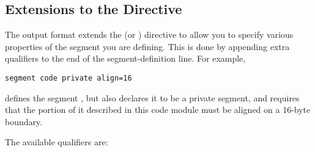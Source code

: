 \subsection{ Extensions to the  Directive
}
\label{subsec:objseg}

The  output format extends the  (or )
directive to allow you to specify various properties of the segment
you are defining. This is done by appending extra qualifiers to the
end of the segment-definition line. For example,

\begin{lstlisting}
segment code private align=16
\end{lstlisting}

defines the segment , but also declares it to be a private
segment, and requires that the portion of it described in this code
module must be aligned on a 16-byte boundary.

The available qualifiers are:

